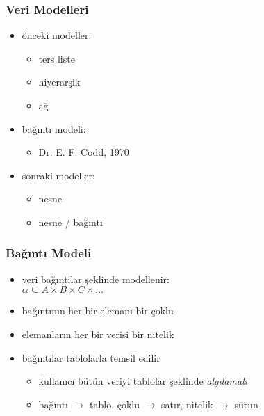 \documentclass[dvipsnames]{beamer}
\theoremstyle{definition}
\theoremstyle{example}
\theoremstyle{plain}
\begin{document}
\begin{frame}
  \frametitle{Veri Modelleri}

  \begin{itemize}
    \item önceki modeller:
    \begin{itemize}
      \item ters liste
      \item hiyerarşik
      \item ağ
    \end{itemize}

    \pause
    \item bağıntı modeli:
    \begin{itemize}
      \item Dr. E. F. Codd, 1970
    \end{itemize}

    \pause
    \item sonraki modeller:
    \begin{itemize}
      \item nesne
      \item nesne / bağıntı
    \end{itemize}
  \end{itemize}
\end{frame}

\begin{frame}
  \frametitle{Bağıntı Modeli}

  \begin{itemize}
    \item veri \alert{bağıntılar} şeklinde modellenir:\\
      $\alpha \subseteq A \times B \times C \times ...$

    \pause
    \medskip
    \item bağıntının her bir elemanı bir \alert{çoklu}
    \item elemanların her bir verisi bir \alert{nitelik}

    \pause
    \medskip
    \item bağıntılar tablolarla temsil edilir
    \begin{itemize}
      \item kullanıcı bütün veriyi tablolar şeklinde \emph{algılamalı}
      \item bağıntı $\rightarrow$ tablo, çoklu $\rightarrow$ satır,
        nitelik $\rightarrow$ sütun
    \end{itemize}
  \end{itemize}
\end{frame}
\end{document}
